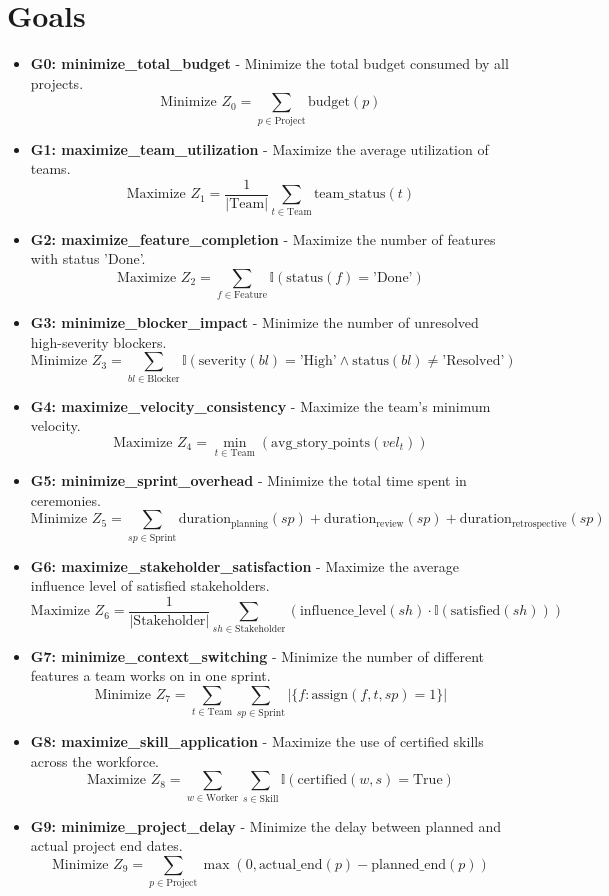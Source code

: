 \documentclass[11pt]{article}
\begin{document}
\section{Goals}
\begin{itemize}
    \item \textbf{G0: minimize\_total\_budget} - Minimize the total budget consumed by all projects.
        \[ \text{Minimize } Z_0 = \sum_{p \in \text{Project}} \text{budget}(p) \]
    \item \textbf{G1: maximize\_team\_utilization} - Maximize the average utilization of teams.
        \[ \text{Maximize } Z_1 = \frac{1}{|\text{Team}|} \sum_{t \in \text{Team}} \text{team\_status}(t) \]
    \item \textbf{G2: maximize\_feature\_completion} - Maximize the number of features with status 'Done'.
        \[ \text{Maximize } Z_2 = \sum_{f \in \text{Feature}} \mathbb{I}(\text{status}(f) = \text{'Done'}) \]
    \item \textbf{G3: minimize\_blocker\_impact} - Minimize the number of unresolved high-severity blockers.
        \[ \text{Minimize } Z_3 = \sum_{bl \in \text{Blocker}} \mathbb{I}(\text{severity}(bl) = \text{'High'} \wedge \text{status}(bl) \neq \text{'Resolved'}) \]
    \item \textbf{G4: maximize\_velocity\_consistency} - Maximize the team's minimum velocity.
        \[ \text{Maximize } Z_4 = \min_{t \in \text{Team}} (\text{avg\_story\_points}(vel_t)) \]
    \item \textbf{G5: minimize\_sprint\_overhead} - Minimize the total time spent in ceremonies.
        \[ \text{Minimize } Z_5 = \sum_{sp \in \text{Sprint}} \text{duration}_{\text{planning}}(sp) + \text{duration}_{\text{review}}(sp) + \text{duration}_{\text{retrospective}}(sp) \]
    \item \textbf{G6: maximize\_stakeholder\_satisfaction} - Maximize the average influence level of satisfied stakeholders.
        \[ \text{Maximize } Z_6 = \frac{1}{|\text{Stakeholder}|} \sum_{sh \in \text{Stakeholder}} (\text{influence\_level}(sh) \cdot \mathbb{I}(\text{satisfied}(sh))) \]
    \item \textbf{G7: minimize\_context\_switching} - Minimize the number of different features a team works on in one sprint.
        \[ \text{Minimize } Z_7 = \sum_{t \in \text{Team}} \sum_{sp \in \text{Sprint}} |\{f: \text{assign}(f, t, sp) = 1\}| \]
    \item \textbf{G8: maximize\_skill\_application} - Maximize the use of certified skills across the workforce.
        \[ \text{Maximize } Z_8 = \sum_{w \in \text{Worker}} \sum_{s \in \text{Skill}} \mathbb{I}(\text{certified}(w, s) = \text{True}) \]
    \item \textbf{G9: minimize\_project\_delay} - Minimize the delay between planned and actual project end dates.
        \[ \text{Minimize } Z_9 = \sum_{p \in \text{Project}} \max(0, \text{actual\_end}(p) - \text{planned\_end}(p)) \]
\end{itemize}
\end{document}
